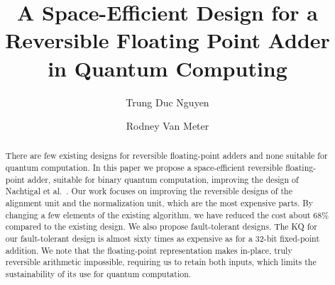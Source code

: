 \documentclass[%
reprint11,
 amsmath,amssymb,
 aps,
]{revtex4-1}
\begin{document}
\title{A Space-Efficient Design for a Reversible Floating Point Adder\\ in Quantum Computing} %



\author{ Trung Duc Nguyen
}
\author{ Rodney Van Meter
}

\begin{abstract}
  There are few existing designs for reversible floating-point adders
  and none suitable for quantum computation. In this paper we propose
  a space-efficient reversible floating-point adder, suitable for
  binary quantum computation, improving the design of Nachtigal et
  al.~\cite{nachtigal}. Our work focuses on improving the reversible
  designs of the alignment unit and the normalization unit, which are
  the most expensive parts. By changing a few elements of the existing
  algorithm, we have reduced the cost about 68\% compared to the
  existing design. We also propose fault-tolerant designs. The KQ for
  our fault-tolerant design is almost sixty times as expensive as for
  a 32-bit fixed-point addition. We note that the floating-point
  representation makes in-place, truly reversible arithmetic
  impossible, requiring us to retain both inputs, which limits the
  sustainability of its use for quantum computation.

\end{abstract}

\maketitle %

\end{document}
